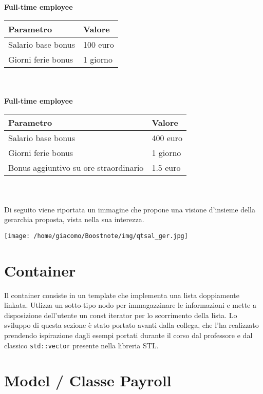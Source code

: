 \documentclass[a4paper,10pt]{article}
\begin{document}
\textbf{Full-time employee} \\

\begin{tabular}{| l | l |}
\hline
\textbf{Parametro} & \textbf{Valore} \\
\hline
Salario base bonus & 100 euro \\
\hline
Giorni ferie bonus & 1 giorno \\
\hline
\end{tabular} \\ \\

\textbf{Full-time employee} \\

\begin{tabular}{| l | l |}
\hline
\textbf{Parametro} & \textbf{Valore} \\
\hline
Salario base bonus & 400 euro \\
\hline
Giorni ferie bonus & 1 giorno \\
\hline
Bonus aggiuntivo su ore straordinario & 1.5 euro \\
\hline
\end{tabular} \\ \\ 

Di seguito viene riportata un immagine che propone una visione d'insieme della gerarchia proposta, vista nella sua interezza.

\begin{center}
\texttt{[image: /home/giacomo/Boostnote/img/qtsal\_ger.jpg]}
\end{center}

\section{Container}
Il container consiste in un template che implementa una lista doppiamente linkata. Utlizza un sotto-tipo nodo per immagazzinare le informazioni e mette a disposizione dell'utente un const iterator per lo scorrimento della lista. Lo sviluppo di questa sezione è stato portato avanti dalla collega, che l'ha realizzato prendendo ispirazione dagli esempi portati durante il corso dal professore e dal classico \verb+std::vector+ presente nella libreria STL. 

\section{Model / Classe Payroll}
\end{document}
